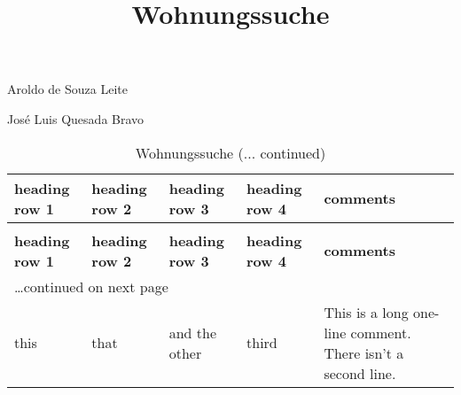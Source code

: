 \documentclass[a4paper]{article}
\newlength{\DUtablewidth} %
\newenvironment{DUlineblock}[1]{%
    \list{}{\setlength{\partopsep}{\parskip}
            \addtolength{\partopsep}{\baselineskip}
            \setlength{\topsep}{0pt}
            \setlength{\itemsep}{0.15\baselineskip}
            \setlength{\parsep}{0pt}
            \setlength{\leftmargin}{#1}}
    \raggedright
  }
  {\endlist}
\begin{document}
\title{Wohnungssuche%
  \label{wohnungssuche}}
\author{}
\date{}
\maketitle


\begin{DUlineblock}{0em}
\item[] Aroldo de Souza Leite
\item[] José Luis Quesada Bravo
\end{DUlineblock}

\setlength{\DUtablewidth}{\linewidth}%
\begin{longtable}[l]{|p{0.191\DUtablewidth}|p{0.191\DUtablewidth}|p{0.191\DUtablewidth}|p{0.191\DUtablewidth}|p{0.191\DUtablewidth}|}
\caption{Wohnungssuche}\\
\hline
\textbf{%
heading row 1
} & \textbf{%
heading row 2
} & \textbf{%
heading row 3
} & \textbf{%
heading row 4
} & \textbf{%
comments
} \\
\hline
\endfirsthead
\caption[]{Wohnungssuche (... continued)}\\
\hline
\textbf{%
heading row 1
} & \textbf{%
heading row 2
} & \textbf{%
heading row 3
} & \textbf{%
heading row 4
} & \textbf{%
comments
} \\
\hline
\endhead
\multicolumn{5}{p{0.96\DUtablewidth}}{\raggedleft\ldots continued on next page}\\
\endfoot
\endlastfoot

this
 & 
that
 & 
and the other
 & 
third
 & 
This is a long one-line comment.
There isn't a second line.
 \\
\hline
\end{longtable}
\end{document}
